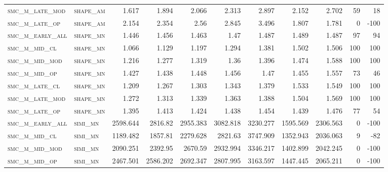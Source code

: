 \begin{landscape}
\begin{center}
\begin{footnotesize}
\begin{longtable}{llrrrrrr|rrr}
\textsc{smc\_m\_late\_mod } & \textsc{shape\_am }   & 1.617    & 1.894    & 2.066    & 2.313    & 2.897    & 2.152       & 2.702         & 59            & 18       \\
\textsc{smc\_m\_late\_op  } & \textsc{shape\_am }   & 2.154    & 2.354    & 2.56     & 2.845    & 3.496    & 1.807       & 1.781         & 0             & -100     \\
\textsc{smc\_m\_early\_all} & \textsc{shape\_mn }   & 1.446    & 1.456    & 1.463    & 1.47     & 1.487    & 1.489       & 1.487         & 97            & 94       \\
\textsc{smc\_m\_mid\_cl   } & \textsc{shape\_mn }   & 1.066    & 1.129    & 1.197    & 1.294    & 1.381    & 1.502       & 1.506         & 100           & 100      \\
\textsc{smc\_m\_mid\_mod  } & \textsc{shape\_mn }   & 1.216    & 1.277    & 1.319    & 1.36     & 1.396    & 1.474       & 1.588         & 100           & 100      \\
\textsc{smc\_m\_mid\_op   } & \textsc{shape\_mn }   & 1.427    & 1.438    & 1.448    & 1.456    & 1.47     & 1.455       & 1.557         & 73            & 46       \\
\textsc{smc\_m\_late\_cl  } & \textsc{shape\_mn }   & 1.209    & 1.267    & 1.303    & 1.343    & 1.379    & 1.533       & 1.549         & 100           & 100      \\
\textsc{smc\_m\_late\_mod } & \textsc{shape\_mn }   & 1.272    & 1.313    & 1.339    & 1.363    & 1.388    & 1.504       & 1.569         & 100           & 100      \\
\textsc{smc\_m\_late\_op  } & \textsc{shape\_mn }   & 1.395    & 1.413    & 1.424    & 1.438    & 1.454    & 1.439       & 1.476         & 77            & 54       \\
\textsc{smc\_m\_early\_all} & \textsc{simi\_mn  }   & 2598.644 & 2816.82  & 2955.383 & 3082.818 & 3230.277 & 1595.569    & 2306.563      & 0             & -100     \\
\textsc{smc\_m\_mid\_cl   } & \textsc{simi\_mn  }   & 1189.482 & 1857.81  & 2279.628 & 2821.63  & 3747.909 & 1352.943    & 2036.063      & 9             & -82      \\
\textsc{smc\_m\_mid\_mod  } & \textsc{simi\_mn  }   & 2090.251 & 2392.95  & 2670.59  & 2932.994 & 3346.217 & 1402.899    & 2042.245      & 0             & -100     \\
\textsc{smc\_m\_mid\_op   } & \textsc{simi\_mn  }   & 2467.501 & 2586.202 & 2692.347 & 2807.995 & 3163.597 & 1447.445    & 2065.211      & 0             & -100     \\

\end{longtable}
\end{footnotesize}
\end{center}
\end{landscape}

